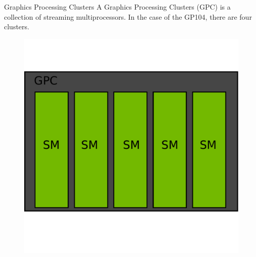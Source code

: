 \documentclass{beamer}
\begin{document}
\begin{frame}{Graphics Processing Clusters}
	A Graphics Processing Clusters (GPC) is a collection of streaming multiprocessors. In the case of the GP104, there are four clusters.
	\begin{figure}
		\includegraphics[scale=0.3]{figures/GPC.pdf}
	\end{figure}
\end{frame}
\end{document}
